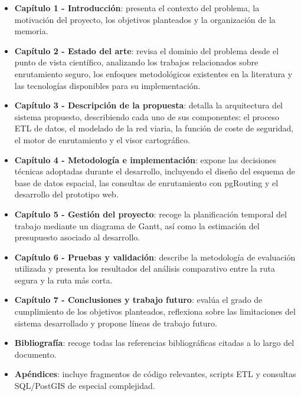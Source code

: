 \begin{itemize}
    \item \textbf{Capítulo 1 - Introducción}: presenta el contexto del problema, la motivación del proyecto, los objetivos planteados y la organización de la memoria.
    
    \item \textbf{Capítulo 2 - Estado del arte}: revisa el dominio del problema desde el punto de vista científico, analizando los trabajos relacionados sobre enrutamiento seguro, los enfoques metodológicos existentes en la literatura y las tecnologías disponibles para su implementación.
    
    \item \textbf{Capítulo 3 - Descripción de la propuesta}: detalla la arquitectura del sistema propuesto, describiendo cada uno de sus componentes: el proceso ETL de datos, el modelado de la red viaria, la función de coste de seguridad, el motor de enrutamiento y el visor cartográfico.
    
    \item \textbf{Capítulo 4 - Metodología e implementación}: expone las decisiones técnicas adoptadas durante el desarrollo, incluyendo el diseño del esquema de base de datos espacial, las consultas de enrutamiento con pgRouting y el desarrollo del prototipo web.
    
    \item \textbf{Capítulo 5 - Gestión del proyecto}: recoge la planificación temporal del trabajo mediante un diagrama de Gantt, así como la estimación del presupuesto asociado al desarrollo.
    
    \item \textbf{Capítulo 6 - Pruebas y validación}: describe la metodología de evaluación utilizada y presenta los resultados del análisis comparativo entre la ruta segura y la ruta más corta.
    
    \item \textbf{Capítulo 7 - Conclusiones y trabajo futuro}: evalúa el grado de cumplimiento de los objetivos planteados, reflexiona sobre las limitaciones del sistema desarrollado y propone líneas de trabajo futuro.
    
    \item \textbf{Bibliografía}: recoge todas las referencias bibliográficas citadas a lo largo del documento.
    
    \item \textbf{Apéndices}: incluye fragmentos de código relevantes, scripts ETL y consultas SQL/PostGIS de especial complejidad.
\end{itemize}
